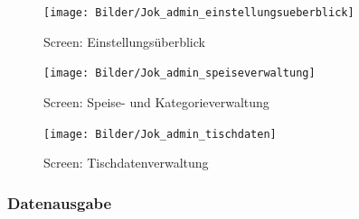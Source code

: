 			\begin{figure}[H]
			\begin{centering}
			\texttt{[image: Bilder/Jok\_admin\_einstellungsueberblick]}
			\par\end{centering}
			\caption{Screen: Einstellungsüberblick}
			\label{Screen: Einstellungsüberblick}
			\end{figure}
			\begin{figure}[H]
			\begin{centering}
			\texttt{[image: Bilder/Jok\_admin\_speiseverwaltung]}
			\par\end{centering}
			\caption{Screen: Speise- und Kategorieverwaltung}
			\label{Screen: Speise- und Kategorieverwaltung}
			\end{figure}
			\begin{figure}[H]
			\begin{centering}
			\texttt{[image: Bilder/Jok\_admin\_tischdaten]}
			\par\end{centering}
			\caption{Screen: Tischdatenverwaltung}
			\label{Screen: Tischdatenverwaltung}
			\end{figure}
    \subsubsection{Datenausgabe}

